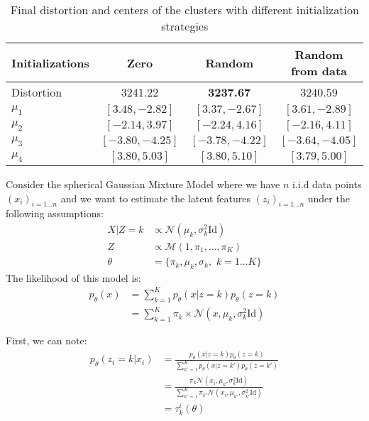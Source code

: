 \documentclass{article}
\begin{document}
\begin{table}[ht!]
\centering
\begin{tabular}{|l|c|c|c|}
\hline
Initializations & Zero & Random & Random from data \\
\hline
Distortion & 3241.22 & \textbf{3237.67} & 3240.59\\
\hline
$\mu_1$ & $[3.48, -2.82]$ & $[3.37, -2.67]$& $[3.61, -2.89]$\\
\hline
$\mu_2$ & $[-2.14, 3.97]$ & $[-2.24, 4.16]$& $[-2.16, 4.11]$\\
\hline
$\mu_3$ & $[-3.80, -4.25]$ &$[-3.78, -4.22]$& $[-3.64, -4.05]$\\
\hline
$\mu_4$ & $[3.80, 5.03]$ &$[3.80, 5.10]$& $[3.79, 5.00]$\\
\hline
\end{tabular}
\caption{Final distortion and centers of the clusters with different initialization strategies}
\label{tb:distortion}
\end{table}



Consider the spherical Gaussian Mixture Model where we have $n$ i.i.d data points $(x_i)_{i=1\ldots n}$ and we want to estimate the latent features $(z_i)_{i=1\ldots n}$ under the following assumptions:
\begin{align*}
X|Z=k &\propto \mathcal{N}(\mu_k, \sigma_k^2 \text{Id})\\
Z &\propto \mathcal{M}(1, \pi_1, \ldots, \pi_K)\\
\theta &= \{\pi_k, \mu_k, \sigma_k,\,\, k=1\ldots K\}
\end{align*}
%
The likelihood of this model is:
\begin{align*}
p_\theta(x) &= \sum_{k=1}^K p_\theta(x|z=k)p_\theta(z=k)\\
&= \sum_{k=1}^K \pi_k \times \mathcal{N}(x, \mu_k, \sigma_k^2 \text{Id})
\end{align*}

First, we can note:
\begin{align*}
p_\theta(z_i=k|x_i) &= \frac{p_\theta(x|z=k)p_\theta(z=k)}{\sum_{k'=1}^K p_\theta(x|z=k')p_\theta(z=k')}\\
&= \frac{\pi_k \mathcal{N}(x_i, \mu_k, \sigma_k^2 \text{Id})}{\sum_{k'=1}^K \pi_{k'} \mathcal{N}(x_i, \mu_{k'}, \sigma_{k'}^2 \text{Id})}\\
&= \tau_k^i(\theta)
\end{align*}
\end{document}
